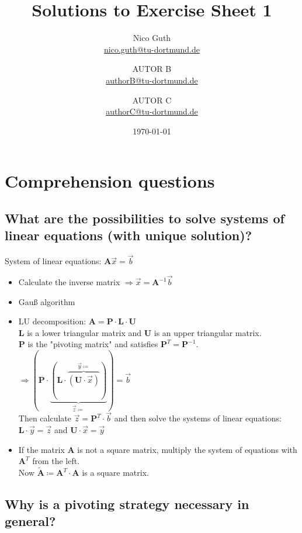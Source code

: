 \documentclass{scrartcl}
\title{Solutions to Exercise Sheet 1}
\author{
    Nico Guth  \\
    \href{mailto:nico.guth@tu-dortmund.de}{nico.guth@tu-dortmund.de}
	\and
	AUTOR B\\
    \href{mailto:authorB@tu-dortmund.de}{authorB@tu-dortmund.de}
	\and
	AUTOR C\\
    \href{mailto:authorC@tu-dortmund.de}{authorC@tu-dortmund.de}
	}
\date{\today}
\begin{document}
\maketitle

\setcounter{section}{-1}
\section{Comprehension questions}

\subsection{What are the possibilities to solve systems of linear equations (with unique solution)?}

System of linear equations: $\symbf{A} \overrightarrow{x}=\overrightarrow{b}$

\begin{itemize}
    \item Calculate the inverse matrix $\Rightarrow \overrightarrow{x} = \symbf{A}^{-1} \overrightarrow{b}$
    \item Gauß algorithm
    \item LU decomposition: $\symbf{A} = \symbf{P} \cdot \symbf{L} \cdot \symbf{U}$ \\
        $\symbf{L}$ is a lower triangular matrix and $\symbf{U}$ is an upper triangular matrix. \\
        $\symbf{P}$ is the "pivoting matrix" and satisfies $\symbf{P}^T=\symbf{P}^{-1}$. \\
        $\Rightarrow ( \symbf{P} \cdot \underbrace{ ( \symbf{L} \cdot \overbrace{ ( \symbf{U} \cdot \overrightarrow{x} ) }^{\overrightarrow{y}\coloneqq} ) }_{\overrightarrow{z} \coloneqq} ) = \overrightarrow{b}$ \\
        Then calculate $\overrightarrow{z} = \symbf{P}^T \cdot \overrightarrow{b}$ 
        and then solve the systems of linear equations:  \\
        $\symbf{L}\cdot\overrightarrow{y}=\overrightarrow{z}$ and $\symbf{U}\cdot\overrightarrow{x} = \overrightarrow{y}$
    \item If the matrix $\symbf{A}$ is not a square matrix, multiply the system of equations with $\symbf{A}^T$ from the left. \\
        Now $\tilde{\symbf{A}} \coloneqq \symbf{A}^T \cdot \symbf{A}$ is a square matrix.
  \end{itemize}

\subsection{Why is a pivoting strategy necessary in general?}
\end{document}

